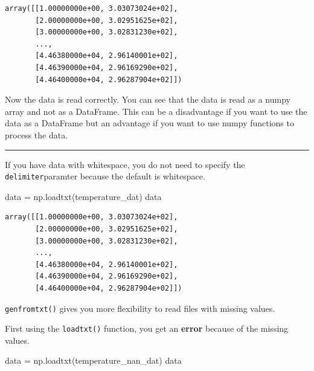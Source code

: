 \documentclass[
  letterpaper,
  DIV=11,
  numbers=noendperiod]{scrreprt}
\newenvironment{Shaded}{\begin{snugshade}}{\end{snugshade}}
\newcommand{\NormalTok}[1]{\textcolor[rgb]{0.00,0.23,0.31}{#1}}
\newcommand{\OperatorTok}[1]{\textcolor[rgb]{0.37,0.37,0.37}{#1}}
\begin{document}
\begin{verbatim}
array([[1.00000000e+00, 3.03073024e+02],
       [2.00000000e+00, 3.02951625e+02],
       [3.00000000e+00, 3.02831230e+02],
       ...,
       [4.46380000e+04, 2.96140001e+02],
       [4.46390000e+04, 2.96169290e+02],
       [4.46400000e+04, 2.96287904e+02]])
\end{verbatim}

Now the data is read correctly. You can see that the data is read as a
numpy array and not as a DataFrame. This can be a disadvantage if you
want to use the data as a DataFrame but an advantage if you want to use
numpy functions to process the data.

\begin{center}\rule{0.5\linewidth}{0.5pt}\end{center}

If you have data with whitespace, you do not need to specify the
\texttt{delimiter}paramter because the default is whitespace.

\begin{Shaded}
\begin{Highlighting}[]
\NormalTok{data }\OperatorTok{=}\NormalTok{ np.loadtxt(temperature\_dat)}
\NormalTok{data}
\end{Highlighting}
\end{Shaded}

\begin{verbatim}
array([[1.00000000e+00, 3.03073024e+02],
       [2.00000000e+00, 3.02951625e+02],
       [3.00000000e+00, 3.02831230e+02],
       ...,
       [4.46380000e+04, 2.96140001e+02],
       [4.46390000e+04, 2.96169290e+02],
       [4.46400000e+04, 2.96287904e+02]])
\end{verbatim}

\texttt{genfromtxt()} gives you more flexibility to read files with
missing values.

First using the \texttt{loadtxt()} function, you get an \textbf{error}
because of the missing values.

\begin{Shaded}
\begin{Highlighting}[]
\NormalTok{data }\OperatorTok{=}\NormalTok{ np.loadtxt(temperature\_nan\_dat)}
\NormalTok{data}
\end{Highlighting}
\end{Shaded}
\end{document}
